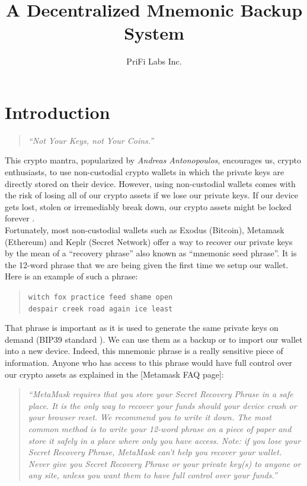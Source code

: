 \documentclass[12pt]{article}
\title{A Decentralized Mnemonic Backup System}
\author{PriFi Labs Inc.}
\date{}
\begin{document}
\maketitle

%

\section{Introduction}

\begin{quote}
{\em ``Not Your Keys, not Your Coins.''}
\end{quote}

This crypto mantra, popularized by {\em Andreas Antonopoulos}, encourages us, crypto enthusiasts, to use non-custodial crypto wallets in which the private keys are directly stored on their device. However, using non-custodial wallets comes with the risk of losing all of our crypto assets if we lose our private keys. If our device gets lost, stolen or irremediably break down, our crypto assets might be locked forever \cite{LostPasswords}.\\

Fortunately, most non-custodial wallets such as Exodus (Bitcoin), Metamask (Ethereum) and Keplr (Secret Network) offer a way to recover our private keys by the mean of a ``recovery phrase'' also known as ``mnemonic seed phrase''. It is the 12-word phrase that we are being given the first time we setup our wallet. Here is an example of such a phrase: 

\begin{quote}
\begin{center}
{\tt witch fox practice feed shame open}\\
{\tt despair creek road again ice least}
\end{center}
\end{quote}

That phrase is important as it is used to generate the same private keys on demand (BIP39 standard \cite{BIP39}). We can use them as a backup or to import our wallet into a new device. Indeed, this mnemonic phrase is a really sensitive piece of information. Anyone who has access to this phrase would have full control over our crypto assets as explained in the [Metamask FAQ page]\cite{MetamaskFAQ}:

\begin{quote}
{\em ``MetaMask requires that you store your Secret Recovery Phrase in a safe place. It is the only way to recover your funds should your device crash or your browser reset. We recommend you to write it down. The most common method is to write your 12-word phrase on a piece of paper and store it safely in a place where only you have access. Note: if you lose your Secret Recovery Phrase, MetaMask can’t help you recover your wallet. Never give you Secret Recovery Phrase or your private key(s) to anyone or any site, unless you want them to have full control over your funds.''}\\
\end{quote}
\end{document}
